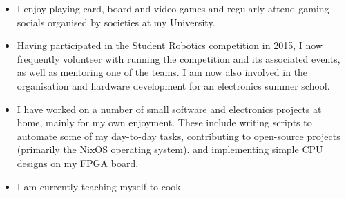 
\begin{itemize}
  \item I enjoy playing card, board and video games and regularly attend gaming socials organised by societies at my University.
  \item Having participated in the Student Robotics competition in 2015, I now frequently volunteer with running the competition and its associated events, as well as mentoring one of the teams. I am now also involved in the organisation and hardware development for an electronics summer school.
  \item I have worked on a number of small software and electronics projects at home, mainly for my own enjoyment. These include writing scripts to automate some of my day-to-day tasks, contributing to open-source projects (primarily the NixOS operating system). and implementing simple CPU designs on my FPGA board.
  \item I am currently teaching myself to cook.
\end{itemize}
